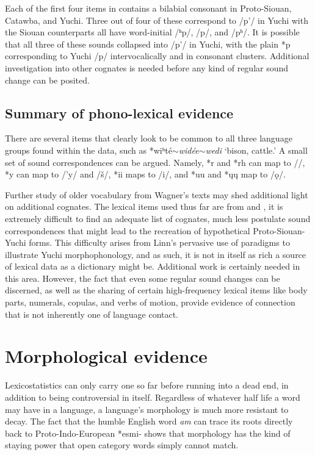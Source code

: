 \documentclass[output=paper]{LSP/langsci}
\begin{document}
Each of the first four items in  contains a bilabial consonant in Proto-Siouan, Catawba, and Yuchi. Three out of four of these correspond to /p'/ in Yuchi with the Siouan counterparts all have word-initial /ʰp/, /p/, and /pʰ/. It is possible that all three of these sounds collapsed into /p'/ in Yuchi, with the plain *p corresponding to Yuchi /p/ intervocalically and in consonant clusters. Additional investigation into other cognates is needed before any kind of regular sound change can be posited.

\subsection{Summary of phono-lexical evidence}

There are several items that clearly look to be common to all three language groups found within the data, such as *wiʰt\'e$\sim$\emph{wid\'ee}$\sim$\emph{wedi} `bison, cattle.' A small set of sound correspondences can be argued. Namely, *r and *rh can map to /\textbeltl/, *y can map to /'y/ and /\v{s}/, *ii maps to /i/, and *uu and *\k{u}\k{u} map to /\k{o}/. 

Further study of older vocabulary from Wagner's \citeyear{Wagner1931} texts may shed additional light on additional cognates. The lexical items used thus far are from \citet{Linn2000} and \citet{Rankinetal2015AccessSeptember}, it is extremely difficult to find an adequate list of cognates, much less postulate sound correspondences that might lead to the recreation of hypothetical Proto-Siouan-Yuchi forms. This difficulty arises from Linn's pervasive use of paradigms to illustrate Yuchi morphophonology, and as such, it is not in itself as rich a source of lexical data as a dictionary might be. Additional work is certainly needed in this area. However, the fact that even some regular sound changes can be discerned, as well as the sharing of certain high-frequency lexical items like body parts, numerals, copulas, and verbs of motion, provide evidence of connection that is not inherently one of language contact.

\section{Morphological evidence}\label{sec:kasak:5}

Lexicostatistics can only carry one so far before running into a dead end, in addition to being controversial in itself. Regardless of whatever half life a word may have in a language, a language's morphology is much more resistant to decay. The fact that the humble English word \textit{am} can trace its roots directly back to Proto-Indo-European *esmi- shows that morphology has the kind of staying power that open category words simply cannot match.
\end{document}
